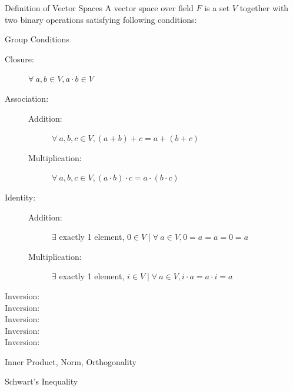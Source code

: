 \documentclass{beamer}
\begin{document}
\begin{frame}{Definition of Vector Spaces}
    A vector space over field $F$ is a set $V$ together with two binary operations satisfying following conditions:
    \begin{block}{Group Conditions}
        {\tiny
            \begin{description}
                \item [Closure: ] $\forall ~a, b \in V, a\cdot b \in V$
                \item [Association: ]\hfill
                \begin{description}
                    \item [Addition: ] $\forall ~a, b, c \in V, (a + b) + c = a + (b + c)$
                    \item [Multiplication: ] $\forall ~a, b, c \in V, (a\cdot b)\cdot c = a\cdot(b\cdot c)$
                \end{description}
                \item [Identity: ]\hfill
                \begin{description}
                    \item [Addition: ] $\exists$ exactly 1 element, $0 \in V \mid \forall ~a \in V, 0 = a = a = 0 = a$
                    \item [Multiplication: ] $\exists$ exactly 1 element, $i \in V \mid \forall ~a \in V, i\cdot a = a\cdot i = a$
                \end{description}
                \item [Inversion: ]
                \item [Inversion: ]
                \item [Inversion: ]
                \item [Inversion: ]
                \item [Inversion: ]
            \end{description}
        }
    \end{block}
\end{frame}

\begin{frame}{Inner Product, Norm, Orthogonality}
\end{frame}

\begin{frame}{Schwart's Inequality}
\end{frame}
\end{document}
